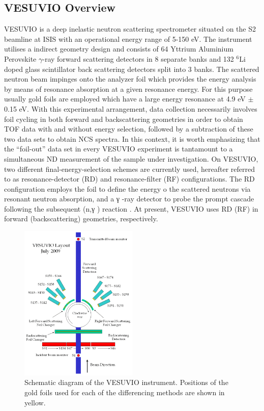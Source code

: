 \documentclass[paper=a4, fontsize=11pt]{scrartcl}	%
\numberwithin{equation}{section}															%
\numberwithin{figure}{section}																%
\numberwithin{table}{section}
\begin{document}
\subsection{VESUVIO Overview}
\label{subsec:VESUVIO-overview}
VESUVIO is a deep inelastic neutron scattering spectrometer situated on the S2 beamline at ISIS with an operational energy range of 5-150 eV. The instrument utilises a indirect geometry design and consists of 64 Yttrium Aluminium Perovskite $\gamma$-ray forward scattering detectors in 8 separate banks and 132 $^6$Li doped glass scintillator back scattering detectors split into 3 banks. The scattered neutron beam impinges onto the analyzer foil which provides the energy analysis by means of resonance absorption at a given resonance energy. For this purpose usually gold foils are employed which have a large energy resonance at 4.9 eV $\pm$ 0.15 eV. With this experimental arrangement, data collection necessarily involves foil cycling in both forward and backscattering geometries in order to obtain TOF data with and without energy selection, followed by a subtraction of these two data sets to obtain NCS spectra. In this context, it is worth emphasizing that the “foil-out” data set in every VESUVIO experiment is tantamount to a simultaneous ND measurement of the sample under investigation. On VESUVIO, two different final-energy-selection schemes are currently used, hereafter referred to as resonance-detector (RD) and resonance-filter (RF) configurations. The RD configuration employs the foil to define the energy o the scattered neutrons via resonant neutron absorption, and a γ -ray detector to probe the prompt cascade following the subsequent (n,γ ) reaction \cite{schooneveld2006foil}. At present, VESUVIO uses RD (RF) in forward (backscattering) geometries, respectively.

\begin{figure}[H]
\centering
\includegraphics[width=0.5\textwidth]{img/vesuvio-diagram.png}
\caption{Schematic diagram of the VESUVIO instrument. Positions of the gold foils used for each of the differencing methods are shown in yellow.}
\label{fig:VESUVIO-diagram}
\end{figure}
\end{document}
